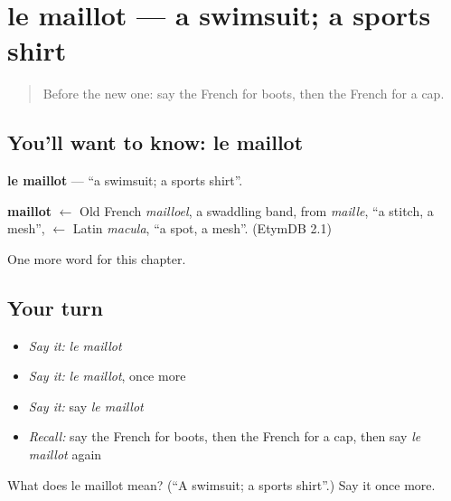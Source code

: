 \section[le maillot]{le maillot — a swimsuit; a sports shirt}

\label{lesson:FR-C117-maillot}



\begin{quote}
Before the new one: say the French for boots, then the French for a cap.
\end{quote}

\subsection*{You'll want to know: le maillot}
\textbf{le maillot} — \textquotedblleft{}a swimsuit; a sports shirt\textquotedblright{}.

\begin{cousinweb}
\textbf{maillot} $\leftarrow$ Old French \emph{mailloel}, a swaddling band, from \emph{maille}, \textquotedblleft{}a stitch, a mesh\textquotedblright{}, $\leftarrow$ Latin \emph{macula}, \textquotedblleft{}a spot, a mesh\textquotedblright{}. (EtymDB 2.1)
\end{cousinweb}

\begin{grammarlens}[title={What you've built}]
One more word for this chapter.
\end{grammarlens}

\subsection*{Your turn}
\begin{itemize}
\raggedright
  \item \emph{Say it:} \emph{le maillot}
  \item \emph{Say it:} \emph{le maillot}, once more
  \item \emph{Say it:} say \emph{le maillot}
  \item \emph{Recall:} say the French for boots, then the French for a cap, then say \emph{le maillot} again
\end{itemize}

\begin{tcolorbox}[breakable,colback=teal!4,colframe=teal!35!black,title={Before you move on}]
What does le maillot mean? (\textquotedblleft{}A swimsuit; a sports shirt\textquotedblright{}.) Say it once more.
\end{tcolorbox}
